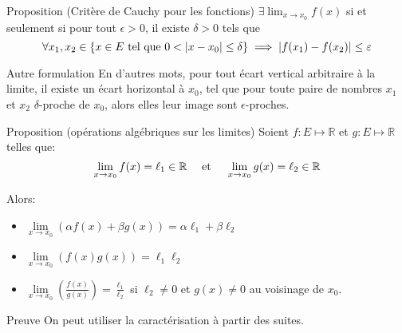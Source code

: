 \documentclass[a4paper]{article}
\begin{document}
\begin{parag}{Proposition (Critère de Cauchy pour les fonctions)}
        $\exists \lim_{x \to x_0} f\left(x\right)$ si et seulement si pour tout $\epsilon > 0$, il existe $\delta > 0$ tels que
        \[\forall x_1, x_2 \in \left\{x \in E \telque 0 < \left|x - x_0\right| \leq \delta\right\} \implies \left|f\left(x_1\right) - f\left(x_2\right)\right| \leq \epsilon\]

    \begin{subparag}{Autre formulation}
            En d'autres mots, pour tout écart vertical arbitraire à la limite, il existe un écart horizontal à $x_0$, tel que pour toute paire de nombres $x_1$ et $x_2$ $\delta$-proche de $x_0$, alors elles leur image sont $\epsilon$-proches.
    \end{subparag}
\end{parag}

\begin{parag}{Proposition (opérations algébriques sur les limites)}
        Soient $f: E\mapsto \mathbb{R}$ et $g: E \mapsto \mathbb{R}$ telles que:
        \[\lim_{x \to x_0} f\left(x\right) = \ell_1 \in \mathbb{R} \mathspace \text{ et } \mathspace \lim_{x \to x_0} g\left(x\right) = \ell_2 \in \mathbb{R}\]

        Alors:
        \begin{itemize}
            \item $\lim\limits_{x \to x_0} \left(\alpha f\left(x\right) + \beta g\left(x\right)\right) = \alpha \ell_1 + \beta \ell_2$
            \item $\lim\limits_{x \to x_0} \left(f\left(x\right)g\left(x\right)\right) = \ell_1 \ell_2$
            \item $\lim\limits_{x \to x_0} \left(\frac{f\left(x\right)}{g\left(x\right)}\right) = \frac{\ell_1}{\ell_2}$ si $\ell_2 \neq 0$ et $g\left(x\right) \neq 0$ au voisinage de $x_0$.
        \end{itemize}

    \begin{subparag}{Preuve}
            On peut utiliser la caractérisation à partir des suites.
    \end{subparag}

\end{parag}
\end{document}
